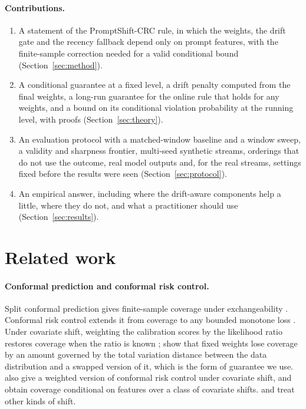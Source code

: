 \paragraph{Contributions.}
\begin{enumerate}[label=(\arabic*)]
  \item A statement of the PromptShift-CRC rule, in which the weights, the drift gate and the recency fallback depend only on prompt features, with the finite-sample correction needed for a valid conditional bound (Section~\ref{sec:method}).
  \item A conditional guarantee at a fixed level, a drift penalty computed from the final weights, a long-run guarantee for the online rule that holds for any weights, and a bound on its conditional violation probability at the running level, with proofs (Section~\ref{sec:theory}).
  \item An evaluation protocol with a matched-window baseline and a window sweep, a validity and sharpness frontier, multi-seed synthetic streams, orderings that do not use the outcome, real model outputs and, for the real streams, settings fixed before the results were seen (Section~\ref{sec:protocol}).
  \item An empirical answer, including where the drift-aware components help a little, where they do not, and what a practitioner should use (Section~\ref{sec:results}).
\end{enumerate}

\section{Related work}\label{sec:related}

\paragraph{Conformal prediction and conformal risk control.}
Split conformal prediction gives finite-sample coverage under exchangeability \citep{vovk2005algorithmic,angelopoulos2021gentle}. Conformal risk control extends it from coverage to any bounded monotone loss \citep{angelopoulos2024conformal}. Under covariate shift, weighting the calibration scores by the likelihood ratio restores coverage when the ratio is known \citep{tibshirani2019conformal}; \citet{barber2023beyond} show that fixed weights lose coverage by an amount governed by the total variation distance between the data distribution and a swapped version of it, which is the form of guarantee we use. \citet{angelopoulos2024conformal} also give a weighted version of conformal risk control under covariate shift, and \citet{gibbs2025conditional} obtain coverage conditional on features over a class of covariate shifts. \citet{cauchois2024robust} and \citet{podkopaev2022tracking} treat other kinds of shift.

